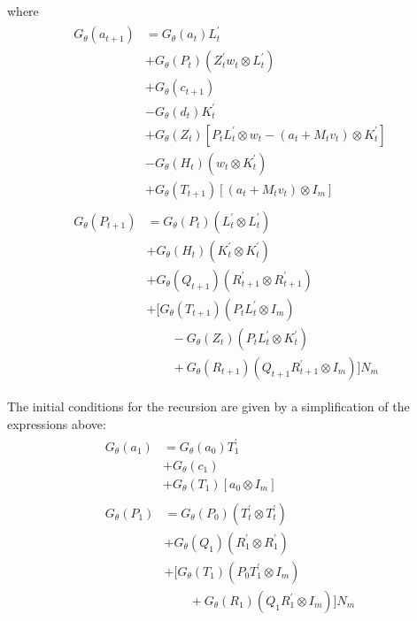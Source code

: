 \documentclass[12pt]{article}
\begin{document}
where 
\begin{align*}
\begin{split}
G_\theta(a_{t+1}) &= G_\theta(a_t)L_t^\prime \\ 	
 &+ G_\theta(P_t) (Z_t^\prime w_t \otimes L_t^\prime) \\
 &+ G_\theta(c_{t+1}) \\
 &- G_\theta(d_t) K_t^\prime \\ 
 &+ G_\theta(Z_t) [P_tL_t^\prime \otimes w_t - (a_t + M_t v_t) \otimes K_t^\prime] \\
 &- G_\theta(H_t) (w_t \otimes K_t^\prime) \\ 
 &+ G_\theta(T_{t+1})[(a_t + M_t v_t) \otimes I_m]
\end{split} \\
\begin{split}
G_\theta(P_{t+1}) &= G_\theta(P_t) (L_t^\prime \otimes L_t^\prime) \\
 &+ G_\theta(H_t)(K_t^\prime \otimes K_t^\prime) \\
 &+ G_\theta(Q_{t+1})(R_{t+1}^\prime \otimes R_{t+1}^\prime) \\
 &+ [G_\theta(T_{t+1})(P_t L_t^\prime \otimes I_m) \\
 &\qquad - G_\theta(Z_t)(P_t L_t^\prime \otimes K_t^\prime) \\
 &\qquad + G_\theta(R_{t+1})(Q_{t+1}R_{t+1}^\prime \otimes I_m) ] N_m
\end{split}
\end{align*}


The initial conditions for the recursion are given by a simplification of the expressions above: 
\begin{align*}
\begin{split}
G_\theta(a_1) &= G_\theta(a_0) T_1^\prime \\ 
 &+ G_\theta(c_1)  \\
 &+ G_\theta(T_1)[a_0 \otimes I_m]
\end{split} \\
\begin{split}
G_\theta(P_1) &= G_\theta(P_0) (T_t^\prime \otimes T_t^\prime) \\
 &+ G_\theta(Q_1)(R_1^\prime \otimes R_1^\prime) \\
 &+ [G_\theta(T_1)(P_0 T_1^\prime \otimes I_m) \\
 &\qquad + G_\theta(R_1)(Q_1 R_1^\prime \otimes I_m) ] N_m
\end{split}
\end{align*}
\end{document}
